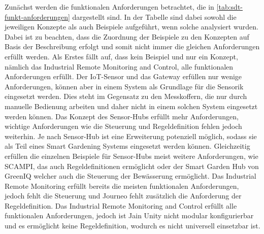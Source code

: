 Zunächst werden die funktionalen Anforderungen betrachtet, die in \cref{tab:sdt-funkt-anforderungen} dargestellt sind.
In der Tabelle sind dabei sowohl die jeweiligen Konzepte als auch Beispiele aufgeführt, wenn solche analysiert wurden.
Dabei ist zu beachten, dass die Zuordnung der Beispiele zu den Konzepten auf Basis der Beschreibung erfolgt und somit nicht immer die gleichen Anforderungen erfüllt werden.
Als Erstes fällt auf, dass kein Beispiel und nur ein Konzept, nämlich das Industrial Remote Monitoring and Control, alle funktionalen Anforderungen erfüllt.
Der IoT-Sensor und das Gateway erfüllen nur wenige Anforderungen, können aber in einem System als Grundlage für die Sensorik eingesetzt werden.
Dies steht im Gegensatz zu den Messkoffern, die nur durch manuelle Bedienung arbeiten und daher nicht in einem solchen System eingesetzt werden können.
Das Konzept des Sensor-Hubs erfüllt mehr Anforderungen, wichtige Anforderungen wie die Steuerung und Regeldefinition fehlen jedoch weiterhin.
Je nach Sensor-Hub ist eine Erweiterung potenziell möglich, sodass sie als Teil eines Smart Gardening Systems eingesetzt werden können.
Gleichzeitig erfüllen die einzelnen Beispiele für Sensor-Hubs meist weitere Anforderungen, wie SCAMPI, das auch Regeldefinitionen ermöglicht oder der Smart Garden Hub von GreenIQ welcher auch die Steuerung der Bewässerung ermöglicht.
Das Industrial Remote Monitoring erfüllt bereits die meisten funktionalen Anforderungen, jedoch fehlt die Steuerung und Journeo fehlt zusätzlich die Anforderung der Regeldefinition.
Das Industrial Remote Monitoring and Control erfüllt alle funktionalen Anforderungen, jedoch ist Jain Unity nicht modular konfigurierbar und es ermöglicht keine Regeldefinition, wodurch es nicht universell einsetzbar ist.


